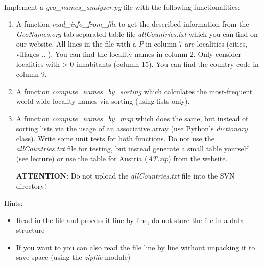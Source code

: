  \\
Implement a \textit{geo\_names\_analyzer.py} file with the following functionalities:
\begin{enumerate}
  \item
    A function \textit{read\_info\_from\_file} to get the described information from
    the \textit{GeoNames.org} tab-separated table file \textit{allCountries.txt}
    which you can find on our website.
    All lines in the file with a $P$ in column 7 are localities (cities, villages .. ).
    You can find the locality names in column 2.
    Only consider localities with > 0 inhabitants (column 15).
    You can find the country code in column 9.
  \item
    A function \textit{compute\_names\_by\_sorting} which
    calculates the most-frequent world-wide locality names via sorting (using lists only).
  \item
    A function \textit{compute\_names\_by\_map} which does the
    same, but instead of sorting lists via the usage of an associative array (use Python's \textit{dictionary} class).
    Write some unit tests for both functions.
    Do not use the \textit{allCountries.txt} file for testing,
    but instead generate a small table yourself (see lecture) or use the table for Austria (\textit{AT.zip}) 
    from the website.
    
    \textbf{ATTENTION}: Do not upload the \textit{allCountries.txt} file into the SVN directory!
\end{enumerate}

Hints:
\begin{itemize}
\item Read in the file and process it line by line, do not store the file in a data structure
\item If you want to you can also read the file line by line without unpacking it to save space (using the \textit{zipfile} module)
\end{itemize}

